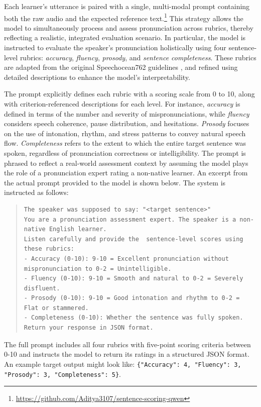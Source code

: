 \documentclass{Interspeech}
\begin{document}
Each learner's utterance is paired with a single, multi-modal prompt containing both the raw audio and the expected reference text.\footnote{\tiny{\url{https://github.com/Aditya3107/sentence-scoring-qwen}}} 
This strategy allows the model to simultaneously process and assess pronunciation across rubrics, thereby reflecting a realistic, integrated evaluation scenario.
In particular, the model is instructed to evaluate the speaker’s pronunciation holistically using four sentence-level rubrics: \emph{accuracy}, \emph{fluency}, \emph{prosody}, and \emph{sentence completeness}. These rubrics are adapted from the original Speechocean762 guidelines \cite[Section~3.1, Table~1]{zhang2021speechocean762}, and refined using detailed descriptions to enhance the model's interpretability.

The prompt explicitly defines each rubric with a scoring scale from 0 to 10, along with criterion-referenced descriptions for each level. For instance, \emph{accuracy} is defined in terms of the number and severity of mispronunciations, while \emph{fluency} considers speech coherence, pause distribution, and hesitations. \emph{Prosody} focuses on the use of intonation, rhythm, and stress patterns to convey natural speech flow. \emph{Completeness} refers to the extent to which the entire target sentence was spoken, regardless of pronunciation correctness or intelligibility. The prompt is phrased to reflect a real-world assessment context by assuming the model plays the role of a pronunciation expert rating a non-native learner. An excerpt from the actual prompt provided to the model is shown below. The system is instructed as follows:

\begin{quote}
\small
\begin{lstlisting}
The speaker was supposed to say: "<target sentence>"
You are a pronunciation assessment expert. The speaker is a non-native English learner.
Listen carefully and provide the  sentence-level scores using these rubrics:
- Accuracy (0-10): 9-10 = Excellent pronunciation without mispronunciation to 0-2 = Unintelligible. 
- Fluency (0-10): 9-10 = Smooth and natural to 0-2 = Severely disfluent.
- Prosody (0-10): 9-10 = Good intonation and rhythm to 0-2 = Flat or stammered.
- Completeness (0-10): Whether the sentence was fully spoken.
Return your response in JSON format.
\end{lstlisting}
\end{quote}

The full prompt includes all four rubrics with five-point scoring criteria between 0-10 and instructs the model to return its ratings in a structured JSON format. An example target output might look like: \texttt{\{"Accuracy": 4, "Fluency": 3, "Prosody": 3, "Completeness": 5\}}.
\end{document}
